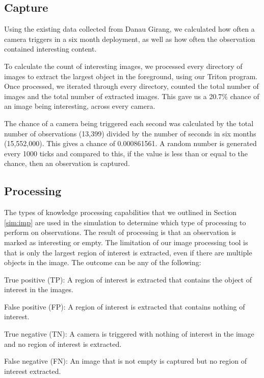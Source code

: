 \subsection{Capture}
	Using the existing data collected from Danau Girang, we calculated how often a camera triggers in a six month deployment, as well as how often the observation contained interesting content. 
	
	To calculate the count of interesting images, we processed every directory of images to extract the largest object in the foreground, using our Triton program. Once processed, we iterated through every directory, counted the total number of images and the total number of extracted images. This gave us a 20.7\% chance of an image being interesting, across every camera.
	
	The chance of a camera being triggered each second was calculated by the total number of observations (13,399) divided by the number of seconds in six months (15,552,000). This gives a chance of 0.000861561. A random number is generated every 1000 ticks and compared to this, if the value is less than or equal to the chance, then an observation is captured.
	
\subsection{Processing}
	The types of knowledge processing capabilities that we outlined in Section \ref{sim:imp} are used in the simulation to determine which type of processing to perform on observations. The result of processing is that an observation is marked as interesting or empty. The limitation of our image processing tool is that is only the largest region of interest is extracted, even if there are multiple objects in the image. The outcome can be any of the following:
		\begin{description}
			\item True positive (TP): A region of interest is extracted that contains the object of interest in the images.
			\item False positive (FP): A region of interest is extracted that contains nothing of interest.
			\item True negative (TN): A camera is triggered with nothing of interest in the image and no region of interest is extracted.
			\item False negative (FN): An image that is not empty is captured but no region of interest extracted.
		\end{description}
	
